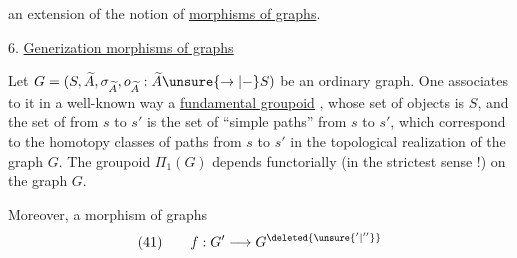 an extension of the notion of \uline{morphisms of graphs}.

\qquad{}

6. \uline{Generization morphisms of graphs }

Let $G=(S,\widetilde A,\sigma_{\widetilde A},o_{\widetilde A}:\widetilde A\unsure{\to|{-}}S)$ be an ordinary graph. One associates to it in a well-known way a \uline{fundamental groupoid} , whose set of objects is $S$, and the set of  from $s$ to $s'$ is the set of ``simple paths'' from $s$ to $s'$, which correspond to the homotopy classes of paths from $s$ to $s'$ in the topological realization of the graph $G$. The groupoid $\Pi_1(G)$ depends functorially (in the strictest sense !) on the graph $G$.

Moreover, a morphism of graphs
\[
(41)\qquad f:G'\longrightarrow G^{\deleted{\unsure{'|''}}}
\]
